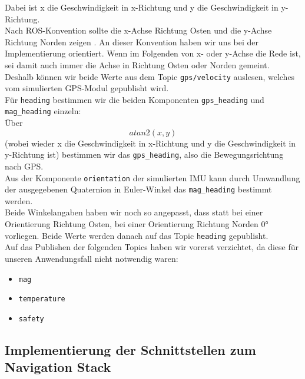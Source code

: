 \documentclass[11pt]{article}
\begin{document}
Dabei ist x die Geschwindigkeit in x-Richtung und y die Geschwindigkeit in y-Richtung.\\
Nach ROS-Konvention sollte die x-Achse Richtung Osten und die y-Achse Richtung Norden zeigen \cite{REP105}. An dieser Konvention haben wir uns bei der Implementierung orientiert. Wenn im Folgenden von x- oder y-Achse die Rede ist, sei damit auch immer die Achse in Richtung Osten oder Norden gemeint.\\
Deshalb können wir beide Werte aus dem Topic \texttt{gps/velocity} auslesen, welches vom simulierten GPS-Modul gepublisht wird.\\
Für \texttt{heading} bestimmen wir die beiden Komponenten \texttt{gps\_heading} und \texttt{mag\_heading} einzeln:\\
Über 
\begin{equation}
	atan2(x,y) 	
\end{equation}
(wobei wieder x die Geschwindigkeit in x-Richtung und y die Geschwindigkeit in y-Richtung ist) bestimmen wir das \texttt{gps\_heading}, also die Bewegungsrichtung nach GPS. \\
Aus der Komponente \texttt{orientation} der simulierten IMU kann durch Umwandlung der ausgegebenen Quaternion in Euler-Winkel das \texttt{mag\_heading} bestimmt werden.\\
Beide Winkelangaben haben wir noch so angepasst, dass statt bei einer Orientierung Richtung Osten, bei einer Orientierung Richtung Norden 0° vorliegen. Beide Werte werden danach auf das Topic \texttt{heading} gepublisht.\\
Auf das Publishen der folgenden Topics haben wir vorerst verzichtet, da diese für unseren Anwendungsfall nicht notwendig waren:
\begin{itemize}
	\item \texttt{mag}
	\item \texttt{temperature}
	\item \texttt{safety}
\end{itemize}

\subsection{Implementierung der Schnittstellen zum Navigation Stack}
\end{document}
